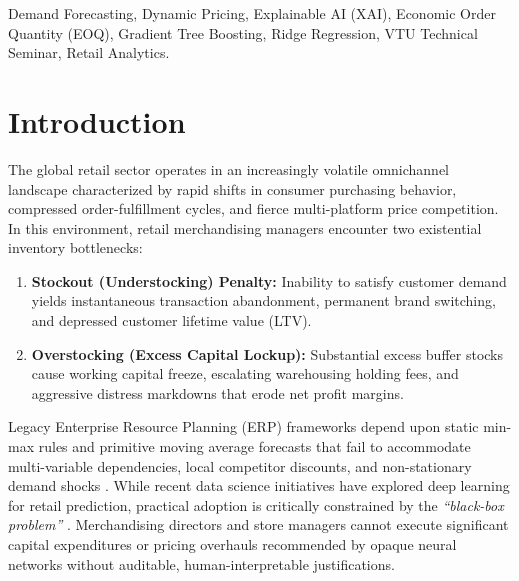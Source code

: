 \documentclass[conference]{IEEEtran}
\begin{document}
\begin{IEEEkeywords}
Demand Forecasting, Dynamic Pricing, Explainable AI (XAI), Economic Order Quantity (EOQ), Gradient Tree Boosting, Ridge Regression, VTU Technical Seminar, Retail Analytics.
\end{IEEEkeywords}

\section{Introduction}
The global retail sector operates in an increasingly volatile omnichannel landscape characterized by rapid shifts in consumer purchasing behavior, compressed order-fulfillment cycles, and fierce multi-platform price competition. In this environment, retail merchandising managers encounter two existential inventory bottlenecks:
\begin{enumerate}
    \item \textbf{Stockout (Understocking) Penalty:} Inability to satisfy customer demand yields instantaneous transaction abandonment, permanent brand switching, and depressed customer lifetime value (LTV).
    \item \textbf{Overstocking (Excess Capital Lockup):} Substantial excess buffer stocks cause working capital freeze, escalating warehousing holding fees, and aggressive distress markdowns that erode net profit margins.
\end{enumerate}

Legacy Enterprise Resource Planning (ERP) frameworks depend upon static min-max rules and primitive moving average forecasts that fail to accommodate multi-variable dependencies, local competitor discounts, and non-stationary demand shocks \cite{smith2021}. While recent data science initiatives have explored deep learning for retail prediction, practical adoption is critically constrained by the \textit{``black-box problem''} \cite{guidotti2018}. Merchandising directors and store managers cannot execute significant capital expenditures or pricing overhauls recommended by opaque neural networks without auditable, human-interpretable justifications.
\end{document}
